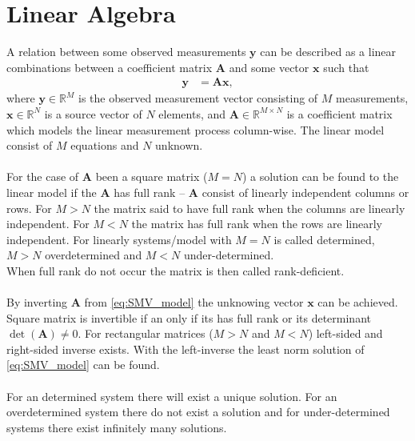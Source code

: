 \section{Linear Algebra}
A relation between some observed measurements $\mathbf{y}$ can be described as a linear combinations between a coefficient matrix $\mathbf{A}$ and some vector $\mathbf{x}$ such that
\begin{align}\label{eq:SMV_model}
\mathbf{y} &= \mathbf{Ax},
\end{align}
where $\mathbf{y} \in \mathbb{R}^M$ is the observed measurement vector consisting of $M$ measurements, $\mathbf{x} \in \mathbb{R}^N$ is a source vector of $N$ elements, and $\mathbf{A} \in \mathbb{R}^{M \times N}$ is a coefficient matrix which models the linear measurement process column-wise. The linear model consist of $M$ equations and $N$ unknown.
\\ \\
For the case of $\mathbf{A}$ been a square matrix ($M = N$) a solution can be found to the linear model if the $\mathbf{A}$ has full rank -- $\mathbf{A}$ consist of linearly independent columns or rows. For $M > N$ the matrix said to have full rank when the columns are linearly independent. For $M < N$ the matrix has full rank when the rows are linearly independent. For linearly systems/model with $M = N$ is called determined, $M > N$ overdetermined and $M < N$ under-determined. 
\\
When full rank do not occur the matrix is then called rank-deficient.
\\ \\
By inverting $\mathbf{A}$ from \eqref{eq:SMV_model} the unknowing vector $\mathbf{x}$ can be achieved. Square matrix is invertible if an only if its has full rank or its determinant $\det(\mathbf{A}) \neq 0$. For rectangular matrices ($M > N$ and $M < N$) left-sided and right-sided inverse exists.
With the left-inverse the least norm solution of \eqref{eq:SMV_model} can be found.
\\ \\
For an determined system there will exist a unique solution. For an overdetermined system there do not exist a solution and for under-determined systems there exist infinitely many solutions.
